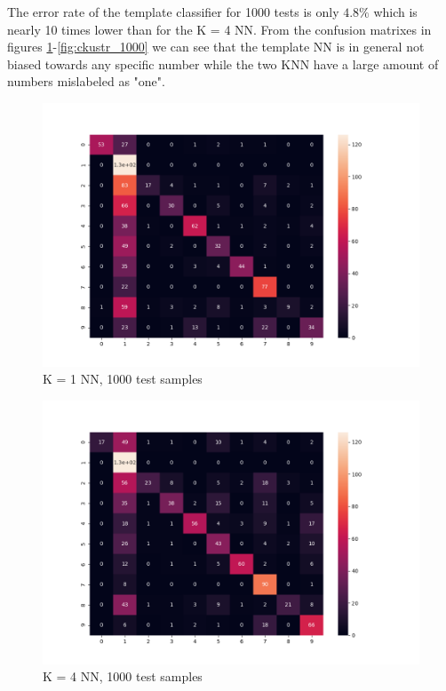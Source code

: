 \documentclass{article}
\begin{document}
The error rate of the template classifier for 1000 tests is only $4.8\%$ which is nearly 10 times lower than for the K = 4 NN.
From the confusion matrixes in figures \ref{fig:NN_1000}-\ref{fig:ckustr_1000}  we can see that the template NN is in general not biased towards any specific number while the two KNN have a large amount of numbers mislabeled as "one".
\newline
\begin{figure}[htbp]
  \centering
  \includegraphics[width=\textwidth]{./confusion_matrices/NN_1000.png}
  \caption{K = 1 NN, 1000 test samples}
  \label{fig:NN_1000}
\end{figure}

\begin{figure}[htbp]
  \centering
  \includegraphics[width=\textwidth]{./confusion_matrices/KNN4_1000.png}
  \caption{K = 4 NN, 1000 test samples}
  \label{fig:KNN_1000}
\end{figure}
\end{document}
